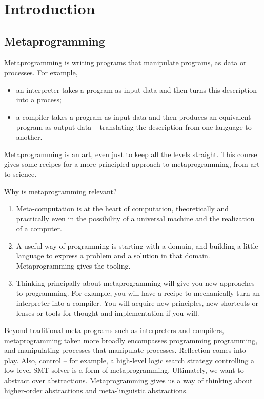 \chapter{Introduction}

\section{Metaprogramming}


Metaprogramming is writing programs that manipulate programs, as
data or processes. For example,
\begin{itemize}
\item an interpreter takes a program as input data and then turns this
  description into a process;
\item a compiler takes a program as input data and then produces an
  equivalent program as output data -- translating the description
  from one language to another.
\end{itemize}

Metaprogramming is an art, even just to keep all the levels straight.
This course gives some recipes for a more principled approach to
metaprogramming, from art to science.

Why is metaprogramming relevant?

\begin{enumerate}
\item Meta-computation is at the heart of computation, theoretically
and practically even in the possibility of a universal machine and the
realization of a computer.

\item A useful way of programming is starting with a domain, and
building a little language to express a problem and a solution in that
domain. Metaprogramming gives the tooling.

\item Thinking principally about metaprogramming will give you new
approaches to programming. For example,
you will have a recipe to mechanically turn an interpreter into a
compiler. You will acquire new principles, new shortcuts or lenses or
tools for thought and implementation if you will.

\end{enumerate}

Beyond traditional meta-programs such as interpreters and compilers,
metaprogramming taken more broadly
encompasses programming programming, and manipulating processes that
manipulate processes. Reflection comes into play. Also, control -- for
example, a high-level logic search strategy controlling a low-level
SMT solver is a form of metaprogramming.
Ultimately, we want to abstract over abstractions. Metaprogramming
gives us a way of thinking about higher-order abstractions and
meta-linguistic abstractions.

